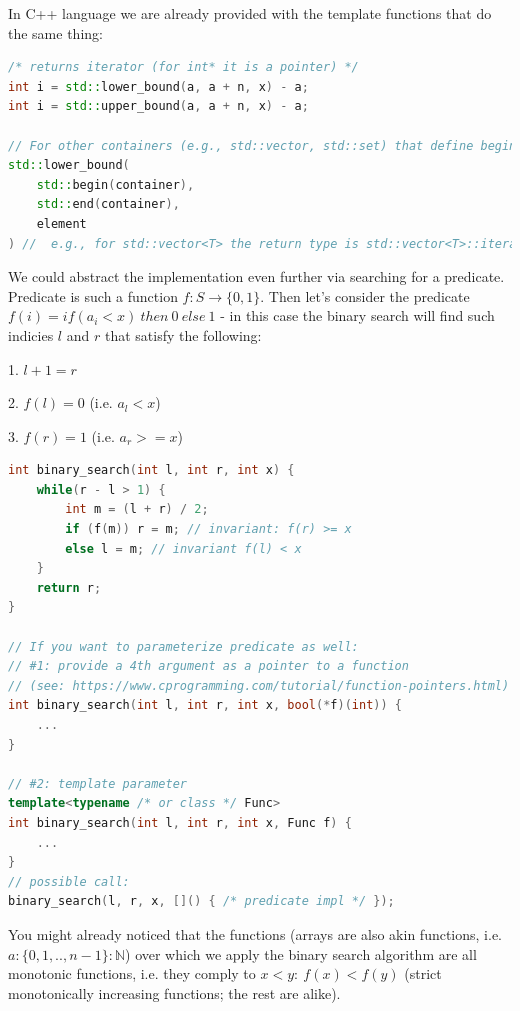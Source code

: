 
In C++ language we are already provided with the template functions that do the same thing:

\begin{lstlisting}[language=C++]
/* returns iterator (for int* it is a pointer) */
int i = std::lower_bound(a, a + n, x) - a;
int i = std::upper_bound(a, a + n, x) - a;

// For other containers (e.g., std::vector, std::set) that define begin()/end() operations use the following:
std::lower_bound(
    std::begin(container),
    std::end(container),
    element
) //  e.g., for std::vector<T> the return type is std::vector<T>::iterator, i.e. pointer to the element
\end{lstlisting}



We could abstract the implementation even further via searching for a predicate. Predicate is such a function $f: S \to \{0, 1\}$. Then let's consider the predicate $f(i) = if (a_i < x) \ then\ 0\ else\ 1$ - in this case the binary search will find such indicies $l$ and $r$ that satisfy the following:

1. $l + 1 = r$

2. $f(l) = 0$ (i.e. $a_l < x$)

3. $f(r) = 1$ (i.e. $a_r >= x$)

\begin{lstlisting}[language=C++]
int binary_search(int l, int r, int x) {
    while(r - l > 1) {
        int m = (l + r) / 2;
        if (f(m)) r = m; // invariant: f(r) >= x
        else l = m; // invariant f(l) < x
    }
    return r;
}

// If you want to parameterize predicate as well:
// #1: provide a 4th argument as a pointer to a function
// (see: https://www.cprogramming.com/tutorial/function-pointers.html)
int binary_search(int l, int r, int x, bool(*f)(int)) {
    ...
}

// #2: template parameter
template<typename /* or class */ Func>
int binary_search(int l, int r, int x, Func f) {
    ...
}
// possible call:
binary_search(l, r, x, []() { /* predicate impl */ });
\end{lstlisting}


You might already noticed that the functions (arrays are also akin functions, i.e. $a: \{0, 1, .., n-1\}: \mathbb{N} $) over which we apply the binary search algorithm are all monotonic functions, i.e. they comply to $x < y: \ f(x) < f(y)$ (strict monotonically increasing functions; the rest are alike).

